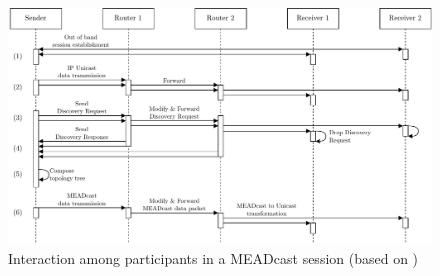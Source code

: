 \begin{figure}
    \centering
    \includegraphics[width=.95\textwidth]{Bilder/mead_seq_dia.pdf}
    \caption{Interaction among participants in a MEADcast session (based on
        \cite{meadcast2})}
    \label{fig:mead_seq_dia}
\end{figure}

